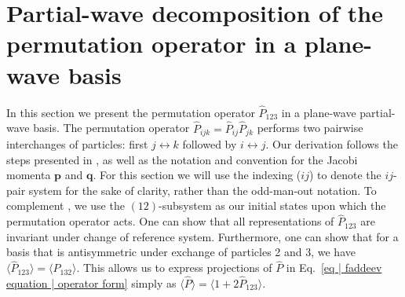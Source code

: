 \documentclass[aps,prc,showpacs,twocolumn,floatfix,nobibnotes,nofootinbib,amsmath,amssymb,longbibliography]{revtex4-2}
\begin{document}
\appendix
\section{Partial-wave decomposition of the permutation operator in a plane-wave basis}
\label{app | permutation operator plane wave representation}
In this section we present the permutation operator $\hat{P}_{123}$ in
a plane-wave partial-wave basis. The permutation operator
$\hat{P}_{ijk}=\hat{P}_{ij}\hat{P}_{jk}$ performs two pairwise
interchanges of particles: first $j\leftrightarrow k$ followed by
$i\leftrightarrow j$. Our derivation follows the steps presented in
\cite{Hebeler:2020ocj}, as well as the notation and convention for the
Jacobi momenta $\boldsymbol{p}$ and $\boldsymbol{q}$. For this section
we will use the indexing ($ij$) to denote the $ij$-pair system for the
sake of clarity, rather than the odd-man-out notation. To complement
\cite{Hebeler:2020ocj}, we use the $(12)$-subsystem as our initial
states upon which the permutation operator acts. One can show that all
representations of $\hat{P}_{123}$ are invariant under change of
reference system. Furthermore, one can show \cite{Hebeler:2020ocj,Glockle:aYZcaRsU}
that for a basis that is antisymmetric under exchange of particles 2 and 3, we have
$\langle\hat{P}_{123}\rangle=\langle\hat{P}_{132}\rangle$. This allows us
to express projections of $\hat{P}$ in Eq.~\eqref{eq | faddeev equation | operator form}
simply as $\langle \hat{P}\rangle = \langle 1+2\hat{P}_{123}\rangle$.
\end{document}
